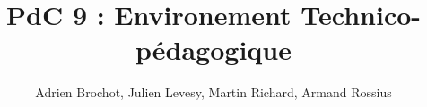 \documentclass[a4paper]{article}
\begin{document}
\title{PdC 9 : Environement Technico-pédagogique}
\author{Adrien Brochot, Julien Levesy, Martin Richard, Armand Rossius}

\maketitle


\newpage
\tableofcontents
\newpage
\newpage










\end{document}
